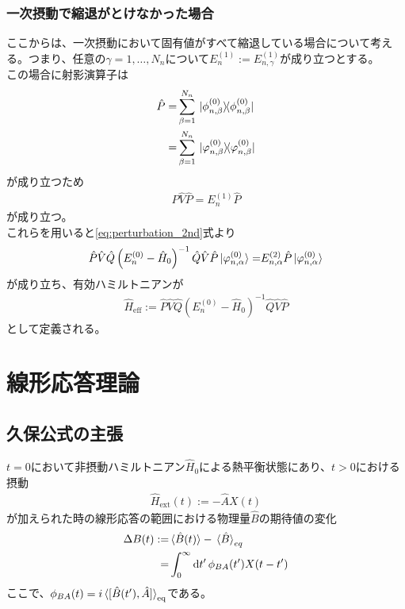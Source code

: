 \documentclass{ltjsarticle}
\begin{document}
\subsubsection{一次摂動で縮退がとけなかった場合}
ここからは、一次摂動において固有値がすべて縮退している場合について考える。つまり、任意の$\gamma=1,\dots,N_n$について$E_n^{(1)}:=E_{n,\gamma}^{(1)}$が成り立つとする。\\
この場合に射影演算子は
\begin{align}
  \hat{P}=&\sum_{\beta=1}^{N_n}\ketbra*{\phi^{(0)}_{n,\beta}}{\phi^{(0)}_{n,\beta}}\\
  =&\sum_{\beta=1}^{N_n}\ketbra*{\varphi^{(0)}_{n,\beta}}{\varphi^{(0)}_{n,\beta}}\\
\end{align}
が成り立つため
\begin{align}
  \hat{P}\hat{V}\hat{P}=E_n^{(1)}\hat{P}
\end{align}
が成り立つ。\\
これらを用いると\eqref{eq:perturbation_2nd}式より
\begin{align}
  \hat{P}\hat{V}\hat{Q}\left( E_n^{(0)}-\hat{H}_0 \right)^{-1}\hat{Q}\hat{V}\hat{P}\ket*{\varphi^{(0)}_{n,\alpha}}=&E^{(2)}_{n,\alpha}\hat{P}\ket*{\varphi^{(0)}_{n,\alpha}}\\
\end{align}
が成り立ち、有効ハミルトニアンが
\begin{align}
  \hat{H}_{\text{eff}}:=\hat{P}\hat{V}\hat{Q}\left( E_n^{(0)}-\hat{H}_0 \right)^{-1}\hat{Q}\hat{V}\hat{P}
\end{align}
として定義される。
\section{線形応答理論}
\subsection{久保公式の主張}
$t=0$において非摂動ハミルトニアン$\hat{H}_0$による熱平衡状態にあり、$t>0$における摂動
\begin{align}
  \hat{H}_{\textrm{ext}}(t):=-\hat{A}X(t)
\end{align}
が加えられた時の線形応答の範囲における物理量$\hat{B}$の期待値の変化\\
\begin{align}
  \Delta B(t):=&\ev*{\hat{B}(t)}-\ev*{\hat{B}}_{eq}\\
  =&\int^\infty_0\dd{t'}\phi_{BA}(t')X(t-t')\\
\end{align}
ここで、$\phi_{BA}(t)=i\ev*{[\hat{B}(t'),\hat{A}]}_{\textrm{eq}}$である。\\
\end{document}
